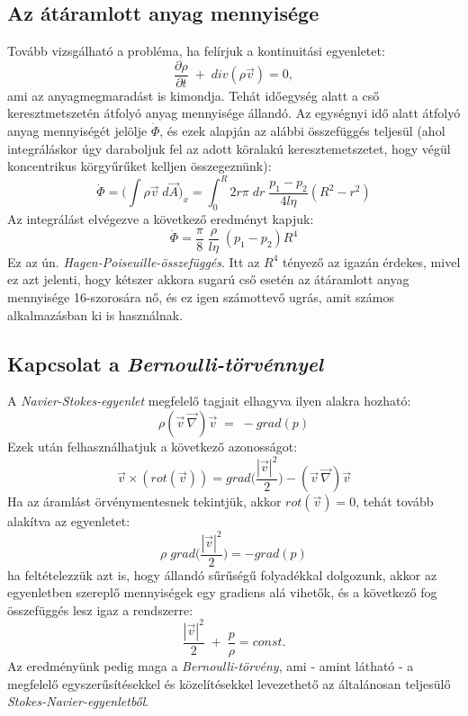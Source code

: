 \documentclass[a4paper, titlepage]{article}
\begin{document}
\subsection*{Az átáramlott anyag mennyisége}
Tovább vizsgálható a probléma, ha felírjuk a kontinuitási egyenletet:
\begin{equation}
\frac{\partial \rho}{\partial t}\;+\;div(\rho\vec{v})=0,
\end{equation}
ami az anyagmegmaradást is kimondja. Tehát időegység alatt a cső keresztmetszetén átfolyó anyag mennyisége állandó. Az egységnyi idő alatt átfolyó anyag mennyiségét jelölje $\dot{\Phi}$, és ezek alapján az alábbi összefüggés teljesül (ahol integráláskor úgy daraboljuk fel az adott köralakú keresztemetszetet, hogy végül koncentrikus körgyűrűket kelljen összegeznünk):
\begin{equation}
\dot{\Phi}=\bigg(\int \rho \vec{v}\;d\vec{A}\bigg)_x=\int_{0}^{R} 2r\pi\;dr\; \frac{p_1-p_2}{4l\eta}(R^2-r^2)
\end{equation}
Az integrálást elvégezve a következő eredményt kapjuk:
\begin{equation}
\dot{\Phi}=\frac{\pi}{8}\;\frac{\rho}{l\eta}\;(p_1-p_2)R^4
\end{equation}
Ez az ún. \textit{Hagen-Poiseuille-összefüggés}. Itt az $R^4$ tényező az igazán érdekes, mivel ez azt jelenti, hogy kétszer akkora sugarú cső esetén az átáramlott anyag mennyisége 16-szorosára nő, és ez igen számottevő ugrás, amit számos alkalmazásban ki is használnak.
\subsection*{Kapcsolat a \textit{Bernoulli-törvénnyel}}
A \textit{Navier-Stokes-egyenlet} megfelelő tagjait elhagyva ilyen alakra hozható:
\begin{equation}
\rho(\vec{v}\,\vec{\nabla})\vec{v}\;=\;-grad(p)
\end{equation}
Ezek után felhasználhatjuk a következő azonosságot:
$$\vec{v}\times(rot(\vec{v}))=grad\bigg(\frac{|\vec{v}|^2}{2}\bigg)-(\vec{v}\,\vec{\nabla})\vec{v}$$
Ha az áramlást örvénymentesnek tekintjük, akkor $rot(\vec{v})=0$, tehát tovább alakítva az egyenletet:
$$\rho\;grad\bigg(\frac{|\vec{v}|^2}{2}\bigg)=-grad(p)$$
ha feltételezzük azt is, hogy állandó sűrűségű folyadékkal dolgozunk, akkor az egyenletben szereplő mennyiségek egy gradiens alá vihetők, és a következő fog összefüggés lesz igaz a rendszerre:
\begin{equation}
\frac{|\vec{v}|^2}{2}\;+\;\frac{p}{\rho}=const.
\end{equation}
Az eredményünk pedig maga a \textit{Bernoulli-törvény}, ami - amint látható - a megfelelő egyszerűsítésekkel és közelítésekkel levezethető az általánosan teljesülő \textit{Stokes-Navier-egyenletből}.
\end{document}
